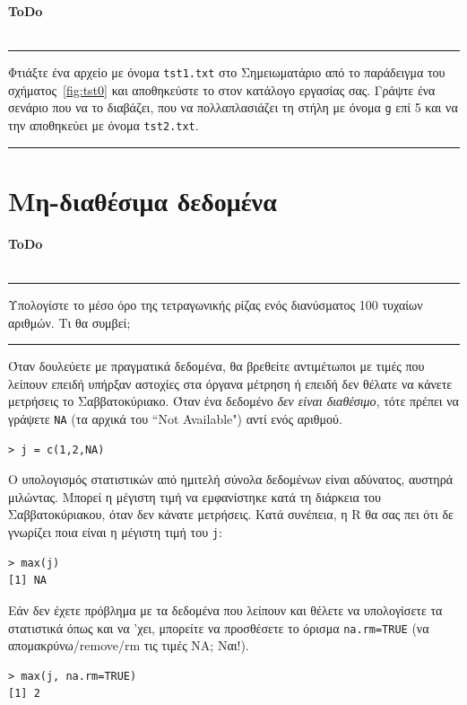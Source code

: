 \documentclass[a4paper,10pt,twocolumn]{article}
\newenvironment{ToDo} {
  \begin{flushright}
    \hfill
    \begin{minipage}{0.9\columnwidth}
    \textsf{\textbf{ToDo}} \\
      \vspace{-0.7cm}\\
      {\color{Gray}\rule[-0.05cm]{\columnwidth}{1.5pt}}} {
      {\color{Gray}\rule[0.3cm]{\columnwidth}{1.5pt}}
    \end{minipage}
    \vspace{0.3cm}
  \end{flushright}
  }
\begin{document}
\begin{ToDo}
  Φτιάξτε ένα αρχείο με όνομα \texttt{tst1.txt} στο Σημειωματάριο από το παράδειγμα του σχήματος~\ref{fig:tst0}
  και αποθηκεύστε το στον κατάλογο εργασίας σας. Γράψτε ένα σενάριο που να το διαβάζει, που να πολλαπλασιάζει
  τη στήλη με όνομα \texttt{g} επί 5 και να την αποθηκεύει με όνομα \texttt{tst2.txt}.\\
\end{ToDo}


\section{Μη-διαθέσιμα δεδομένα}

\begin{ToDo}
Υπολογίστε το μέσο όρο της τετραγωνικής ρίζας ενός διανύσματος 100 τυχαίων αριθμών. Τι θα συμβεί;
\end{ToDo}

Όταν δουλεύετε με πραγματικά δεδομένα, θα βρεθείτε αντιμέτωποι με τιμές που λείπουν επειδή υπήρξαν αστοχίες
στα όργανα μέτρηση ή επειδή δεν θέλατε να κάνετε μετρήσεις το Σαββατοκύριακο. Όταν ένα δεδομένο \emph{δεν
είναι διαθέσιμο}, τότε πρέπει να γράψετε \texttt{NA} (τα αρχικά του ``Not Available") αντί ενός αριθμού. 

\begin{Verbatim}[frame=single,gobble=0]
> j = c(1,2,NA)
\end{Verbatim}

Ο υπολογισμός στατιστικών από ημιτελή σύνολα δεδομένων είναι αδύνατος, αυστηρά μιλώντας. Μπορεί η μέγιστη τιμή
να εμφανίστηκε κατά τη διάρκεια του Σαββατοκύριακου, όταν δεν κάνατε μετρήσεις. Κατά συνέπεια, η R θα σας πει
ότι δε γνωρίζει ποια είναι η μέγιστη τιμή του \texttt{j}: 

\begin{Verbatim}[frame=single,gobble=0]
> max(j)
[1] NA
\end{Verbatim}

Εάν δεν έχετε πρόβλημα με τα δεδομένα που λείπουν και θέλετε να υπολογίσετε τα στατιστικά όπως και να 'χει,
μπορείτε να προσθέσετε το όρισμα \texttt{na.rm=TRUE} (να απομακρύνω/remove/rm τις τιμές NA; Ναι!). 

\begin{Verbatim}[frame=single,gobble=0]
> max(j, na.rm=TRUE)
[1] 2
\end{Verbatim}
\end{document}
